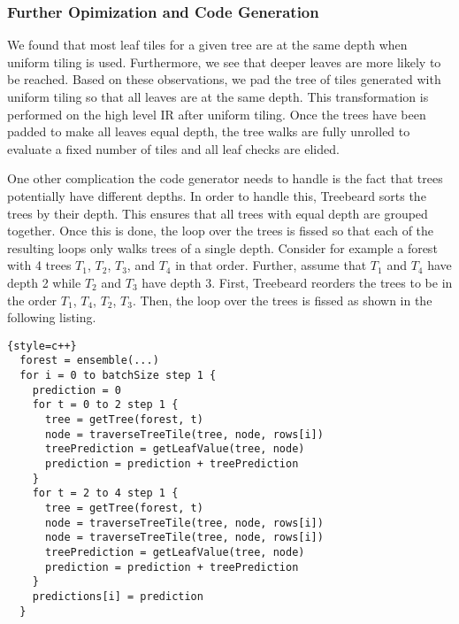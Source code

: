 \subsubsection{Further Opimization and Code Generation}
We found that most leaf tiles for a given tree are at the same depth when uniform tiling is used. Furthermore, we see that deeper leaves 
are more likely to be reached.
Based on these observations, we pad the tree of tiles generated with uniform tiling so that all leaves are at the same depth.
This transformation is performed on the high level IR after uniform tiling. 
Once the trees have been padded to make all leaves equal depth, the tree walks are fully unrolled to evaluate a fixed 
number of tiles and all leaf checks are elided.

One other complication the code generator needs to handle is the fact that trees potentially have different depths. In order to handle
this, Treebeard sorts the trees by their depth. This ensures that all trees with equal depth are grouped together. Once this is done, 
the loop over the trees is fissed so that each of the resulting loops only walks trees of a single depth. Consider for example a 
forest with 4 trees $T_1$, $T_2$, $T_3$, and $T_4$ in that order. Further, assume that $T_1$ and $T_4$ have depth 2 while $T_2$ and $T_3$
have depth 3. First, Treebeard reorders the trees to be in the order $T_1$, $T_4$, $T_2$, $T_3$. Then, the loop over the trees is fissed
as shown in the following listing.

\begin{lstlisting}{style=c++}
  forest = ensemble(...)
  for i = 0 to batchSize step 1 {
    prediction = 0
    for t = 0 to 2 step 1 {
      tree = getTree(forest, t) 
      node = traverseTreeTile(tree, node, rows[i])
      treePrediction = getLeafValue(tree, node)
      prediction = prediction + treePrediction
    }
    for t = 2 to 4 step 1 {
      tree = getTree(forest, t) 
      node = traverseTreeTile(tree, node, rows[i])
      node = traverseTreeTile(tree, node, rows[i])
      treePrediction = getLeafValue(tree, node)
      prediction = prediction + treePrediction
    }
    predictions[i] = prediction
  }  
\end{lstlisting}

